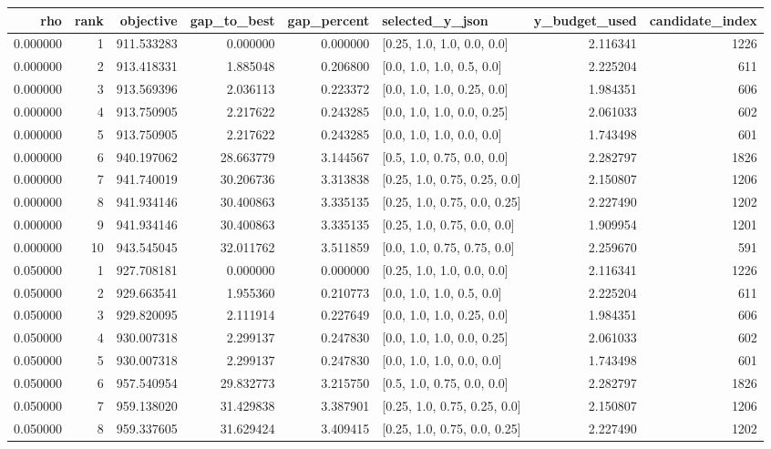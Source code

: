 \begin{tabular}{rrrrrlrr}
\toprule
rho & rank & objective & gap\_to\_best & gap\_percent & selected\_y\_json & y\_budget\_used & candidate\_index \\
\midrule
0.000000 & 1 & 911.533283 & 0.000000 & 0.000000 & [0.25, 1.0, 1.0, 0.0, 0.0] & 2.116341 & 1226 \\
0.000000 & 2 & 913.418331 & 1.885048 & 0.206800 & [0.0, 1.0, 1.0, 0.5, 0.0] & 2.225204 & 611 \\
0.000000 & 3 & 913.569396 & 2.036113 & 0.223372 & [0.0, 1.0, 1.0, 0.25, 0.0] & 1.984351 & 606 \\
0.000000 & 4 & 913.750905 & 2.217622 & 0.243285 & [0.0, 1.0, 1.0, 0.0, 0.25] & 2.061033 & 602 \\
0.000000 & 5 & 913.750905 & 2.217622 & 0.243285 & [0.0, 1.0, 1.0, 0.0, 0.0] & 1.743498 & 601 \\
0.000000 & 6 & 940.197062 & 28.663779 & 3.144567 & [0.5, 1.0, 0.75, 0.0, 0.0] & 2.282797 & 1826 \\
0.000000 & 7 & 941.740019 & 30.206736 & 3.313838 & [0.25, 1.0, 0.75, 0.25, 0.0] & 2.150807 & 1206 \\
0.000000 & 8 & 941.934146 & 30.400863 & 3.335135 & [0.25, 1.0, 0.75, 0.0, 0.25] & 2.227490 & 1202 \\
0.000000 & 9 & 941.934146 & 30.400863 & 3.335135 & [0.25, 1.0, 0.75, 0.0, 0.0] & 1.909954 & 1201 \\
0.000000 & 10 & 943.545045 & 32.011762 & 3.511859 & [0.0, 1.0, 0.75, 0.75, 0.0] & 2.259670 & 591 \\
0.050000 & 1 & 927.708181 & 0.000000 & 0.000000 & [0.25, 1.0, 1.0, 0.0, 0.0] & 2.116341 & 1226 \\
0.050000 & 2 & 929.663541 & 1.955360 & 0.210773 & [0.0, 1.0, 1.0, 0.5, 0.0] & 2.225204 & 611 \\
0.050000 & 3 & 929.820095 & 2.111914 & 0.227649 & [0.0, 1.0, 1.0, 0.25, 0.0] & 1.984351 & 606 \\
0.050000 & 4 & 930.007318 & 2.299137 & 0.247830 & [0.0, 1.0, 1.0, 0.0, 0.25] & 2.061033 & 602 \\
0.050000 & 5 & 930.007318 & 2.299137 & 0.247830 & [0.0, 1.0, 1.0, 0.0, 0.0] & 1.743498 & 601 \\
0.050000 & 6 & 957.540954 & 29.832773 & 3.215750 & [0.5, 1.0, 0.75, 0.0, 0.0] & 2.282797 & 1826 \\
0.050000 & 7 & 959.138020 & 31.429838 & 3.387901 & [0.25, 1.0, 0.75, 0.25, 0.0] & 2.150807 & 1206 \\
0.050000 & 8 & 959.337605 & 31.629424 & 3.409415 & [0.25, 1.0, 0.75, 0.0, 0.25] & 2.227490 & 1202 \\

\end{tabular}
